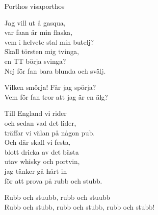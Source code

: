 \begin{song}{Porthos visa}{porthos}
\begin{vers}
Jag vill ut å gasqua,\\
var faan är min flaska,\\
vem i helvete stal min butelj?\\
Skall törsten mig tvinga,\\
en TT börja svinga?\\
Nej för fan bara blunda och svälj.\\
\end{vers}
\begin{vers}
Vilken smörja! Får jag spörja?\\
Vem för fan tror att jag är en älg?\\
\end{vers}
\begin{vers}
Till England vi rider\\
och sedan vad det lider,\\
träffar vi välan på någon pub.\\
Och där skall vi festa,\\
blott dricka av det bästa\\
utav whisky och portvin,\\
jag tänker gå hårt in\\
för att prova på rubb och stubb.\\
\end{vers}
\begin{vers}
Rubb och stuubb, rubb och stuubb\\
Rubb och stubb, rubb och stubb, rubb och stubb!\\
\end{vers}
\end{song}
